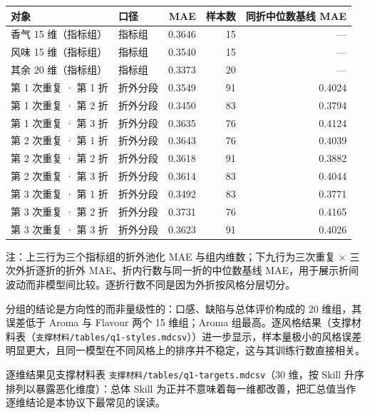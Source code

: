 \documentclass[11pt,a4paper]{article}
\newenvironment{bptable}{%
  \par\medskip\noindent\begin{minipage}{\linewidth}\centering
}{%
  \end{minipage}\par\medskip
}
\newenvironment{tablenote}{%
  \par\smallskip\noindent\footnotesize
  \setlength{\parindent}{0pt}\setlength{\parskip}{0pt}%
  \raggedright
}{%
  \par\medskip
}
\begin{document}
\begin{bptable}
\setcounter{table}{1}
\label{tab:q1-groups}
\par\smallskip
\small
\begin{tabular}{@{}llrrr@{}}
\toprule
对象 & 口径 & MAE & 样本数 & 同折中位数基线 MAE \\
\midrule
香气 15 维（指标组） & 指标组 & 0.3646 & 15 & — \\
风味 15 维（指标组） & 指标组 & 0.3540 & 15 & — \\
其余 20 维（指标组） & 指标组 & 0.3373 & 20 & — \\
第 1 次重复 ·\allowbreak{} 第 1 折 & 折外分段 & 0.3549 & 91 & 0.4024 \\
第 1 次重复 ·\allowbreak{} 第 2 折 & 折外分段 & 0.3450 & 83 & 0.3794 \\
第 1 次重复 ·\allowbreak{} 第 3 折 & 折外分段 & 0.3635 & 76 & 0.4124 \\
第 2 次重复 ·\allowbreak{} 第 1 折 & 折外分段 & 0.3643 & 76 & 0.4039 \\
第 2 次重复 ·\allowbreak{} 第 2 折 & 折外分段 & 0.3618 & 91 & 0.3882 \\
第 2 次重复 ·\allowbreak{} 第 3 折 & 折外分段 & 0.3614 & 83 & 0.4044 \\
第 3 次重复 ·\allowbreak{} 第 1 折 & 折外分段 & 0.3492 & 83 & 0.3771 \\
第 3 次重复 ·\allowbreak{} 第 2 折 & 折外分段 & 0.3731 & 76 & 0.4165 \\
第 3 次重复 ·\allowbreak{} 第 3 折 & 折外分段 & 0.3623 & 91 & 0.4026 \\
\bottomrule
\end{tabular}
\begin{tablenote}注：上三行为三个指标组的折外池化 MAE 与组内维数；下九行为三次重复 × 三次外折逐折的折外 MAE、折内行数与同一折的中位数基线 MAE，用于展示折间波动而非模型间比较。逐折行数不同是因为外折按风格分层切分。\end{tablenote}
\end{bptable}

分组的结论是方向性的而非量级性的：口感、缺陷与总体评价构成的 20
维组，其误差低于 Aroma 与 Flavour 两个 15 维组；Aroma
组最高。逐风格结果（支撑材料表（\texttt{支撑材料/tables/q1-styles.md\textbar{}csv}））进一步显示，样本量极小的风格误差明显更大，且同一模型在不同风格上的排序并不稳定，这与其训练行数直接相关。

逐维结果见支撑材料表
\texttt{支撑材料/tables/q1-targets.md\textbar{}csv}（30 维，按 Skill
升序排列以暴露恶化维度）：总体 Skill
为正并不意味着每一维都改善，把汇总值当作逐维结论是本协议下最常见的误读。
\end{document}
